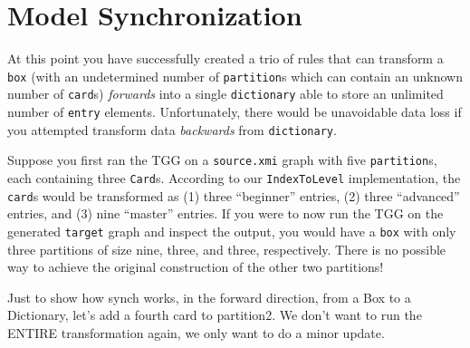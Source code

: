 \newpage
\section{Model Synchronization}
\genHeader

At this point you have successfully created a trio of rules that can transform a \texttt{box} (with an undetermined number of \texttt{partition}s which can
contain an unknown number of \texttt{card}s) \emph{forwards} into a single \texttt{dictionary} able to store an unlimited number of \texttt{entry} elements.
Unfortunately, there would be unavoidable data loss if you attempted transform data \emph{backwards} from \texttt{dictionary}.

Suppose you first ran the TGG on a \texttt{source.xmi} graph with five \texttt{partition}s, each containing three \texttt{Card}s. According to our
\texttt{IndexToLevel} implementation, the \texttt{card}s would be transformed as (1) three ``beginner'' entries, (2) three ``advanced'' entries, and (3)
nine ``master'' entries. If you were to now run the TGG on the generated \texttt{target} graph and inspect the output, you would have a \texttt{box} with
only three partitions of size nine, three, and three, respectively. There is no possible way to achieve the original construction of the other two partitions!

Just to show how synch works, in the forward direction, from a Box to a Dictionary, let's add a fourth card to partition2. We don't want to run the ENTIRE
transformation again, we only want to do a minor update.


